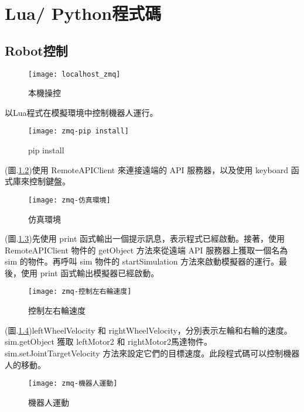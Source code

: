 \chapter{Lua/ Python程式碼}
\section{Robot控制}
\begin{figure}[hbt!]
\begin{center}
\texttt{[image: localhost\_zmq]}
\caption{\Large 本機操控}\label{localhost_zmq}
\end{center}
\end{figure}
以Lua程式在模擬環境中控制機器人運行。\\

\begin{figure}[hbt!]
\begin{center}
\texttt{[image: zmq-pip install]}
\caption{\Large pip install}\label{zmq-pip install}
\end{center}
\end{figure}
(圖.\ref{zmq-pip install})使用 RemoteAPIClient 來連接遠端的 API 服務器，以及使用 keyboard 函式庫來控制鍵盤。\\
\newpage

\begin{figure}[hbt!]
\begin{center}
\texttt{[image: zmq-仿真環境]}
\caption{\Large 仿真環境}\label{zmq-仿真環境}
\end{center}
\end{figure}
(圖.\ref{zmq-仿真環境})先使用 print 函式輸出一個提示訊息，表示程式已經啟動。接著，使用 RemoteAPIClient 物件的 getObject 方法來從遠端 API 服務器上獲取一個名為 sim 的物件。再呼叫 sim 物件的 startSimulation 方法來啟動模擬器的運行。最後，使用 print 函式輸出模擬器已經啟動。\\
\begin{figure}[hbt!]
\begin{center}
\texttt{[image: zmq-控制左右輪速度]}
\caption{\Large 控制左右輪速度}\label{zmq-控制左右輪速度}
\end{center}
\end{figure}

(圖.\ref{zmq-控制左右輪速度})leftWheelVelocity 和 rightWheelVelocity，分別表示左輪和右輪的速度。sim.getObject 獲取 leftMotor2 和 rightMotor2馬達物件。sim.setJointTargetVelocity 方法來設定它們的目標速度。此段程式碼可以控制機器人的移動。\\
\newpage
\begin{figure}[hbt!]
\begin{center}
\texttt{[image: zmq-機器人運動]}
\caption{\Large 機器人運動}\label{zmq-機器人運動}
\end{center}
\end{figure}


